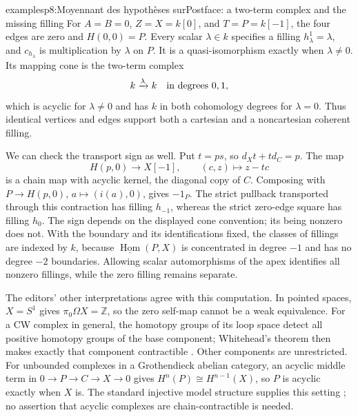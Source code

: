 \begin{dcomment}{examples}{p8:Moyennant des hypothèses sur}{Postface: a two-term complex and the missing filling}
For $A=B=0$, $Z=X=k[0]$, and $T=P=k[-1]$, the four edges are zero and $H(0,0)=P$. Every scalar $\lambda\in k$ specifies a filling $h_\lambda^1=\lambda$, and $c_{h_\lambda}$ is multiplication by $\lambda$ on $P$. It is a quasi-isomorphism exactly when $\lambda\ne0$. Its mapping cone is the two-term complex
\[
 k\xrightarrow{\lambda}k
 \quad\hbox{in degrees }0,1,
\]
which is acyclic for $\lambda\ne0$ and has $k$ in both cohomology degrees for $\lambda=0$. Thus identical vertices and edges support both a cartesian and a noncartesian coherent filling.

We can check the transport sign as well. Put $t=ps$, so $d_Xt+td_C=p$. The map
\[
 H(p,0)\longrightarrow X[-1],\qquad (c,z)\longmapsto z-tc
\]
is a chain map with acyclic kernel, the diagonal copy of $C$. Composing with $P\to H(p,0)$, $a\mapsto(i(a),0)$, gives $-1_P$. The strict pullback transported through this contraction has filling $h_{-1}$, whereas the strict zero-edge square has filling $h_0$. The sign depends on the displayed cone convention; its being nonzero does not. With the boundary and its identifications fixed, the classes of fillings are indexed by $k$, because $\underline{\operatorname{Hom}}(P,X)$ is concentrated in degree $-1$ and has no degree $-2$ boundaries. Allowing scalar automorphisms of the apex identifies all nonzero fillings, while the zero filling remains separate.

The editors' other interpretations agree with this computation. In pointed spaces, $X=S^1$ gives $\pi_0\Omega X=\mathbb Z$, so the zero self-map cannot be a weak equivalence. For a CW complex in general, the homotopy groups of its loop space detect all positive homotopy groups of the base component; Whitehead's theorem then makes exactly that component contractible \citep[Theorem~4.5 and \S4.3]{Hatcher2002}. Other components are unrestricted. For unbounded complexes in a Grothendieck abelian category, an acyclic middle term in $0\to P\to C\to X\to0$ gives $H^n(P)\cong H^{n-1}(X)$, so $P$ is acyclic exactly when $X$ is. The standard injective model structure supplies this setting \citep[Theorem~2.2 and Proposition~2.12 of the preprint]{Hovey2001Sheaves}; no assertion that acyclic complexes are chain-contractible is needed.
\end{dcomment}

